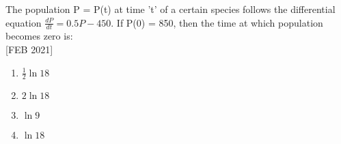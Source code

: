     \item The population P = P(t) at time 't' of a certain species follows the differential equation $\frac{dP}{dt} = 0.5P - 450$. If P(0) = 850, then the time at which population becomes zero is: \\\hfill{[FEB 2021]}
    \begin{multicols}{4}
    \begin{enumerate}
        \item $\frac{1}{2}\ln{18}$
        \item $2\ln{18}$
        \item $\ln{9}$
        \item $\ln{18}$
    \end{enumerate}
    \end{multicols}


